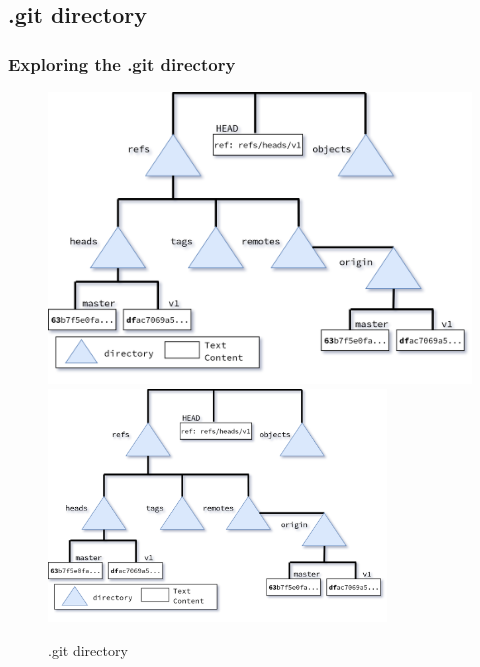 \subsection{.git directory}
\begin{frame}[fragile]
    \frametitle{Exploring the .git directory}
    \begin{figure}
        \begin{center}
            {
                \includegraphics[height=0.75\textheight,keepaspectratio]{./images/gitDirectory-Total.png}
            }
            {
                \includegraphics[height=0.75\textheight,width=0.8\textwidth]{./images/gitDirectory-Total.png}
            }
            \caption{.git directory}
        \end{center}
    \end{figure}
\end{frame}


